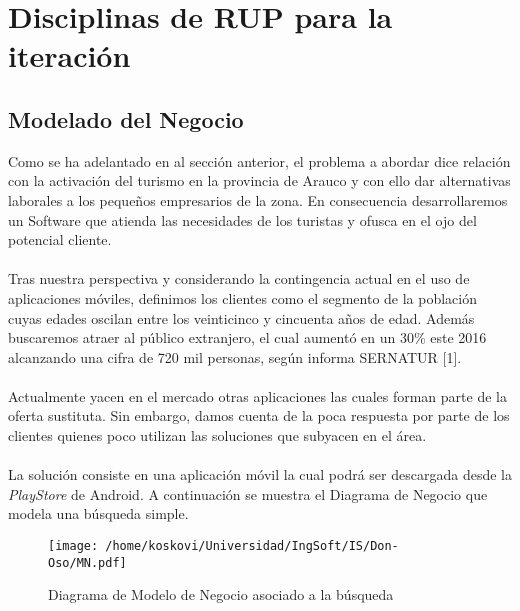 \documentclass[12pt]{article}
\begin{document}
\section{Disciplinas de RUP para la iteración}
\subsection{Modelado del Negocio}
Como se ha adelantado en al sección anterior, el problema a abordar dice relación con la activación del turismo en la provincia de Arauco y con ello dar alternativas laborales a los pequeños empresarios de la zona. En consecuencia desarrollaremos un Software que atienda las necesidades de los turistas y ofusca  en el ojo del potencial cliente.\\\\Tras nuestra perspectiva y considerando la contingencia actual en el uso de aplicaciones móviles, definimos los clientes como el segmento de la población cuyas edades oscilan entre los veinticinco y cincuenta años de edad. Además buscaremos atraer al público extranjero, el cual aumentó en un 30\% este 2016 alcanzando una cifra de 720 mil personas, según informa SERNATUR [1].\\\\Actualmente yacen en el mercado otras aplicaciones las cuales forman parte de la oferta sustituta. Sin embargo, damos cuenta de la poca respuesta por parte de los clientes quienes poco utilizan las soluciones que subyacen en el área.\\\\La solución consiste en una aplicación móvil la cual podrá ser descargada desde la \emph{PlayStore} de Android. A continuación se muestra el Diagrama de Negocio que modela una búsqueda simple.
\begin{figure}[htp]
\begin{center}\centering
\texttt{[image: /home/koskovi/Universidad/IngSoft/IS/Don-Oso/MN.pdf]}
\caption{Diagrama de Modelo de Negocio asociado a la búsqueda}
\label{}\end{center}
\end{figure}
\end{document}
